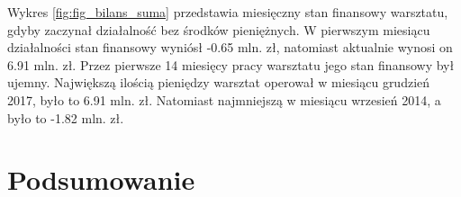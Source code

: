 \documentclass{article}\usepackage[]{graphicx}\usepackage[]{xcolor}
\begin{document}
Wykres \ref{fig:fig_bilans_suma} przedstawia miesięczny stan finansowy warsztatu, gdyby zaczynał działalność bez środków pieniężnych. W pierwszym miesiącu działalności stan finansowy wyniósł -0.65 mln. zł, natomiast aktualnie wynosi on 6.91 mln. zł. Przez pierwsze 14 miesięcy pracy warsztatu jego stan finansowy był ujemny.
Największą ilością pieniędzy warsztat operował w miesiącu grudzień 2017, było to 6.91 mln. zł.
Natomiast najmniejszą w miesiącu wrzesień 2014, a było to -1.82 mln. zł.

\section{Podsumowanie}
\end{document}
